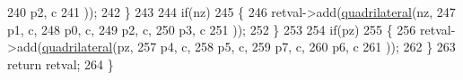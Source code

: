 \begin{DoxyCode}
240                         p2, c
241                         ));
242         \}
243 
244         \textcolor{keywordflow}{if}(nz)
245         \{
246             retval->add(\hyperlink{namespaceGenerate_afd427e6ee5edcf5cab7d521048466496}{quadrilateral}(nz,
247                         p1, c,
248                         p0, c,
249                         p2, c,
250                         p3, c
251                         ));
252         \}
253 
254         \textcolor{keywordflow}{if}(pz)
255         \{
256             retval->add(\hyperlink{namespaceGenerate_afd427e6ee5edcf5cab7d521048466496}{quadrilateral}(pz,
257                         p4, c,
258                         p5, c,
259                         p7, c,
260                         p6, c
261                         ));
262         \}
263         \textcolor{keywordflow}{return} retval;
264     \}
\end{DoxyCode}
